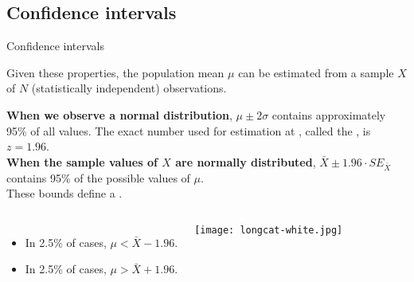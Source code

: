 \documentclass[t]{beamer}
\begin{document}
	\subsection{Confidence intervals}
	\begin{frame}[t]{Confidence intervals}

	Given these properties, the population mean $\mu$ can be estimated from a sample $X$ of $N$ (statistically independent) observations.\vspace{1em}

		\textbf{When we observe a normal distribution}, $\mu \pm 2\sigma$ contains approximately 95\% of all values. The exact number used for estimation at , called the , is $z = 1.96$.\\
		\vspace{1em}
\textbf{When the sample values of $X$ are normally distributed}, $\bar X \pm 1.96 \cdot SE_{\bar X}$ contains 95\% of the possible values of $\mu$.\\[1em]

These bounds define a .


	\begin{columns}[T]
		\hspace{.725em}
		\begin{itemize}
			\item In 2.5\% of cases, $\mu < \bar{X} - 1.96$.
			\item In 2.5\% of cases, $\mu > \bar{X} + 1.96$.
		\end{itemize}
		\vspace{-3.5em}
		\begin{flushright}
		\texttt{[image: longcat-white.jpg]}		
		\end{flushright}
	\end{columns}
	
	\end{frame}

% 	
% 		
% 	
\end{document}

